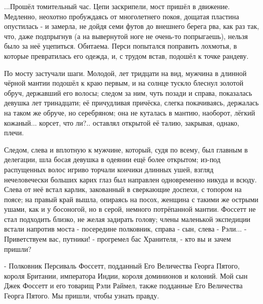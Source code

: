 ...Прошёл томительный час. Цепи заскрипели, мост пришёл в движение. Медленно, неохотно пробуждаясь от многолетнего покоя, дощатая пластина опустилась - и замерла, не дойдя семи футов до внешнего берега рва, как раз так, что, даже подпрыгнув (а на вывернутой ноге не очень-то попрыгаешь), нельзя было за неё уцепиться.
Обитаема.
Перси попытался поправить лохмотья, в которые превратилась его одежда, и, с трудом встав, подошёл к точке рандеву.

По мосту застучали шаги. Молодой, лет тридцати на вид, мужчина в длинной чёрной мантии подошёл к краю первым, и на солнце тускло блеснул золотой обруч, державший его волосы; следом за ним, чуть позади и справа, показалась девушка лет тринадцати; её причудливая причёска, слегка покачиваясь, держалась на таком же обруче, но серебряном; она не куталась в мантию, наоборот, лёгкий кожаный... корсет, что ли?.. оставлял открытой её талию, закрывая, однако, плечи.

Следом, слева и вплотную к мужчине, который, судя по всему, был главным в делегации, шла босая девушка в одеянии ещё более открытом; из-под распущенных волос игриво торчали кончики длинных ушей, взгляд нечеловечески больших карих глаз был направлен одновременно никуда и всюду.
Слева от неё встал карлик, закованный в сверкающие доспехи, с топором на поясе; на правый край вышла, опираясь на посох, женщина с такими же острыми ушами, как и у босоногой, но в серой, немного потрёпанной мантии.
Фоссетт не стал подходить близко, не желая задирать голову; члены маленькой экспедиции встали напротив моста - посередине полковник, справа - сын, слева - Рэли...
- Приветствуем вас, путники! - прогремел бас Хранителя, - кто вы и зачем пришли?

- Полковник Персиваль Фоссетт, подданный Его Величества Георга Пятого, короля Британии, императора Индии, короля доминионов и колоний. Мой сын Джек Фоссетт и его товарищ Рэли Раймел, также подданные Его Величества Георга Пятого. Мы пришли, чтобы узнать правду.

